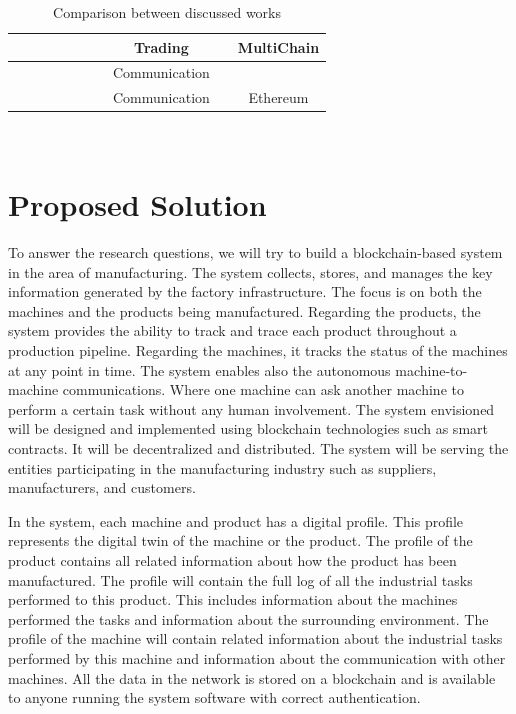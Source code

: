\documentclass[runningheads]{llncs}
\newcommand{\cmark}{\ding{51}}%
\newcommand{\xmark}{\ding{55}}%
\begin{document}
\begin{table}[]
{\begin{tabular}{|c|c|c|c|c|c|c|c|c|c|}
\textbf{\cite{Sikorski2017}} & \cmark & \xmark & \cmark & \xmark & \xmark & \xmark & Trading & \cmark & MultiChain \\ \hline
\textbf{\cite{Afanasev2018}} & \cmark & \xmark & \cmark & \xmark & \xmark & \xmark & Communication & \xmark & \xmark \\ \hline
\textbf{\cite{Garrocho2019}} & \cmark & \xmark & \cmark & \cmark & \cmark & \xmark & Communication & \cmark & Ethereum \\ \hline
\end{tabular}%
}
\\[10pt]
\caption{Comparison between discussed works }
\label{tab1}
\end{table}


\newpage

\section{Proposed Solution}
To answer the research questions, we will try to build a blockchain-based system in the area of manufacturing. The system collects, stores, and manages the key information generated by the factory infrastructure. The focus is on both the machines and the products being manufactured. Regarding the products, the system provides the ability to track and trace each product throughout a production pipeline. Regarding the machines, it tracks the status of the machines at any point in time. The system enables also the autonomous machine-to-machine communications. Where one machine can ask another machine to perform a certain task without any human involvement. The system envisioned will be designed and implemented using blockchain technologies such as smart contracts. It will be decentralized and distributed. The system will be serving the entities participating in the manufacturing industry such as suppliers, manufacturers, and customers. 

\bigbreak 

\noindent In the system, each machine and product has a digital profile. This profile represents the digital twin of the machine or the product.  The profile of the product contains all related information about how the product has been manufactured. The profile will contain the full log of all the industrial tasks performed to this product. This includes information about the machines performed the tasks and information about the surrounding environment. The profile of the machine will contain related information about the industrial tasks performed by this machine and information about the communication with other machines. All the data in the network is stored on a blockchain and is available to anyone running the system software with correct authentication.
\end{document}
